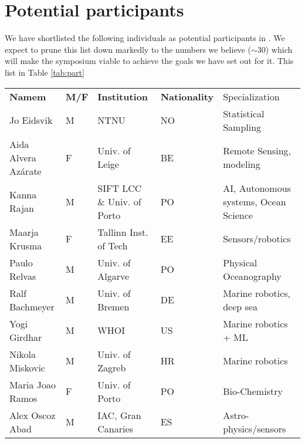 \section{Potential participants}
\label{sec:part}

We have shortlisted the following individuals as potential participants
in \sympe. We expect to prune this list down markedly to the numbers we
believe ($\sim 30$) which will make the symposium viable to achieve the
goals we have set out for it. This list in Table \ref{tab:part}

\begin{table}[]
  \footnotesize{
\begin{tabular}{|p{3cm}|p{0.5cm}|p{3.5cm}|p{1cm}|p{4cm}|}
  \rowcolor{Gray}
  \bfseries Namem& \bfseries M/F&\bfseries Institution & \bfseries Nationality& Specialization\\
Jo Eidsvik               & M   & NTNU                                  & NO       & Statistical Sampling                            \\
\hline
Aida Alvera Az\'{a}rate    & F   & Univ. of Leige                        & BE       & Remote Sensing, modeling                        \\
\hline
Kanna Rajan              & M   & SIFT LCC \& Univ. of Porto            & PO       & AI, Autonomous systems, Ocean Science           \\
 \hline
Maarja Krusma            & F   & Tallinn Inst. of Tech                 & EE  & Sensors/robotics                                \\
  \hline
Paulo Relvas             & M   & Univ. of Algarve                      & PO       & Physical Oceanography                           \\
\hline
Ralf Bachmeyer           & M   & Univ. of Bremen                       & DE       & Marine robotics, deep sea                       \\
\hline
Yogi Girdhar             & M   & WHOI                                  & US       & Marine robotics + ML                            \\
\hline
Nikola Miskovic          & M   & Univ. of Zagreb                       & HR  & Marine robotics                                 \\
\hline
Maria Joao Ramos         & F   & Univ. of Porto                        & PO       & Bio-Chemistry                                   \\
\hline
Alex Oscoz Abad          & M   & IAC, Gran Canaries                    & ES       & Astro-physics/sensors                           \\

\end{tabular}}
\end{table}
